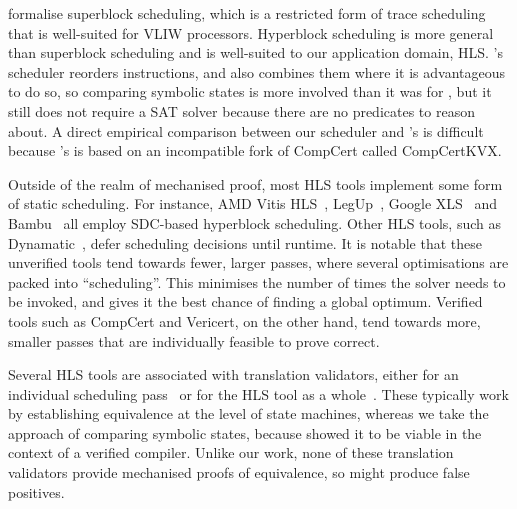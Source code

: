\textcite{six22_formal_verif_super_sched} formalise superblock scheduling, which
is a restricted form of trace scheduling that is well-suited for VLIW
processors.  Hyperblock scheduling is more general than superblock scheduling
and is well-suited to our application domain, HLS.\@
\citeauthor{six22_formal_verif_super_sched}'s scheduler reorders instructions,
and also combines them where it is advantageous to do so, so comparing symbolic
states is more involved than it was for
\citeauthor{tristan08_formal_verif_trans_valid}, but it still does not require a
SAT solver because there are no predicates to reason about.  A direct empirical
comparison between our scheduler and
\citeauthor{six22_formal_verif_super_sched}'s is difficult because
\citeauthor{six22_formal_verif_super_sched}'s is based on an incompatible fork
of CompCert called CompCertKVX.

Outside of the realm of mechanised proof, most HLS tools implement some form of
static scheduling.  For instance, AMD Vitis HLS~\cite{amd23_vitis_forum},
LegUp~\cite[][p.60]{canis15_legup}, Google XLS~\cite[line~112]{google23_xls} and
Bambu~\cite[line~304]{ferrandi21_bambu} all employ SDC-based hyperblock
scheduling.  Other HLS tools, such as
Dynamatic~\cite{josipović18_dynam_sched_high_synth}, defer scheduling decisions
until runtime.  It is notable that these unverified tools tend towards fewer,
larger passes, where several optimisations are packed into \enquote{scheduling}.
This minimises the number of times the solver needs to be invoked, and gives it
the best chance of finding a global optimum. Verified tools such as CompCert and
Vericert, on the other hand, tend towards more, smaller passes that are
individually feasible to prove correct.

Several HLS tools are associated with translation validators, either for an
individual scheduling
pass~\cite{chouksey20_verif_sched_condit_behav_high_level_synth,
  karfa06_formal_verif_method_sched_high_synth, kim04_autom_fsmd} or for the HLS
tool as a whole~\cite{mentor20_catap_high_level_synth, tiemeyer19_crest}. These
typically work by establishing equivalence at the level of state machines,
whereas we take the approach of comparing symbolic states, because
\textcite{tristan08_formal_verif_trans_valid} showed it to be viable in the
context of a verified compiler. Unlike our work, none of these translation
validators provide mechanised proofs of equivalence, so might produce false
positives.


